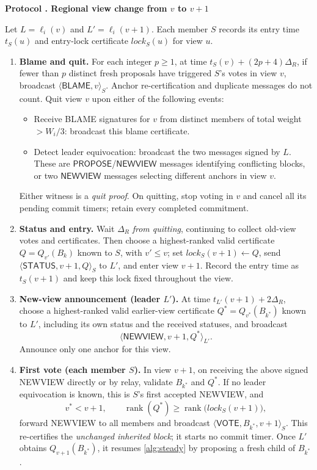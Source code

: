 \documentclass[11pt,a4paper,onecolumn]{article}
\newcommand{\rank}{\operatorname{rank}}
\newcommand{\Tag}[1]{\ensuremath{\mathsf{#1}}}
\newcounter{protocol}
\newenvironment{protocol}[2]{\refstepcounter{protocol}\label{#1}
\begin{mdframed}[nobreak=true,linewidth=.6pt,skipabove=9pt,skipbelow=9pt,
innertopmargin=7pt,innerbottommargin=7pt]\small
\noindent\textbf{Protocol \theprotocol. #2}\par\smallskip}{\end{mdframed}}
\begin{document}
\begin{protocol}{alg:change}{Regional view change from $v$ to $v+1$}
Let $L=\ell_i(v)$ and $L'=\ell_i(v+1)$. Each member $S$ records its entry
time $t_S(u)$ and entry-lock certificate $\mathit{lock}_S(u)$ for view $u$.
\begin{enumerate}[label=\textbf{V\arabic*.},itemsep=4pt]
\item \textbf{Blame and quit.} For each integer $p\geq1$, at time
$t_S(v)+(2p+4)\Delta_R$, if fewer than $p$ distinct fresh proposals have
triggered $S$'s votes in view $v$, broadcast $\langle\Tag{BLAME},v\rangle_S$.
Anchor re-certification and duplicate messages do not count.
Quit view $v$ upon either of the following events:
\begin{itemize}
\item Receive BLAME signatures for $v$ from distinct members of total
weight $>W_i/3$: broadcast this blame certificate.
\item Detect leader equivocation: broadcast the two messages signed by $L$.
These are \Tag{PROPOSE}/\Tag{NEWVIEW} messages identifying conflicting blocks,
or two \Tag{NEWVIEW} messages selecting different anchors in view $v$.
\end{itemize}
Either witness is a \emph{quit proof}. On quitting, stop voting in $v$ and
cancel all its pending commit timers; retain every completed commitment.

\item \textbf{Status and entry.} Wait $\Delta_R$ \emph{from quitting},
continuing to collect old-view votes and certificates. Then choose a
highest-ranked valid certificate $Q=Q_{v'}(B_k)$ known to $S$, with $v'\leq v$;
set $\mathit{lock}_S(v+1)\gets Q$, send
$\langle\Tag{STATUS},v+1,Q\rangle_S$ to $L'$, and enter view $v+1$.
Record the entry time as $t_S(v+1)$ and keep this lock fixed throughout the view.

\item \textbf{New-view announcement (leader $L'$).} At time
$t_{L'}(v+1)+2\Delta_R$, choose a highest-ranked valid earlier-view
certificate $Q^*=Q_{v^*}(B_{k^*})$ known to $L'$, including its own status
and the received statuses, and broadcast
\[
 \langle\Tag{NEWVIEW},v+1,Q^*\rangle_{L'}.
\]
Announce only one anchor for this view.

\item \textbf{First vote (each member $S$).} In view $v+1$, on receiving
the above signed NEWVIEW directly or by relay, validate $B_{k^*}$ and $Q^*$.
If no leader equivocation is known, this is $S$'s first accepted NEWVIEW,
and
\[
 v^*<v+1,
 \qquad \rank(Q^*)\geq\rank\bigl(\mathit{lock}_S(v+1)\bigr),
\]
forward NEWVIEW to all members and broadcast
$\langle\Tag{VOTE},B_{k^*},v+1\rangle_S$.
This re-certifies the \emph{unchanged inherited block}; it starts no commit
timer. Once $L'$ obtains $Q_{v+1}(B_{k^*})$, it resumes
\cref{alg:steady} by proposing a fresh child of $B_{k^*}$.
\end{enumerate}
\end{protocol}
\end{document}
